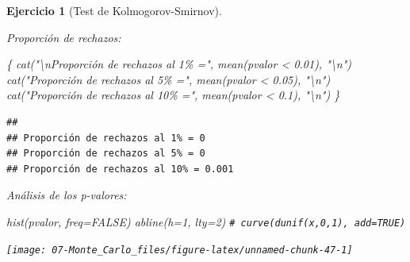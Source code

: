\documentclass[
]{book}
\newenvironment{Shaded}{\begin{snugshade}}{\end{snugshade}}
\newcommand{\AttributeTok}[1]{\textcolor[rgb]{0.77,0.63,0.00}{#1}}
\newcommand{\CommentTok}[1]{\textcolor[rgb]{0.56,0.35,0.01}{\textit{#1}}}
\newcommand{\ConstantTok}[1]{\textcolor[rgb]{0.00,0.00,0.00}{#1}}
\newcommand{\DecValTok}[1]{\textcolor[rgb]{0.00,0.00,0.81}{#1}}
\newcommand{\FloatTok}[1]{\textcolor[rgb]{0.00,0.00,0.81}{#1}}
\newcommand{\FunctionTok}[1]{\textcolor[rgb]{0.00,0.00,0.00}{#1}}
\newcommand{\NormalTok}[1]{#1}
\newcommand{\SpecialCharTok}[1]{\textcolor[rgb]{0.00,0.00,0.00}{#1}}
\newcommand{\StringTok}[1]{\textcolor[rgb]{0.31,0.60,0.02}{#1}}
\theoremstyle{break}
\newtheorem{exercise}{Ejercicio}[chapter]
\theoremstyle{nonumberplain}
\renewcommand{\CommentTok}[1]{\textcolor[rgb]{0.41,0.41,0.41}{\texttt{#1}}}
\begin{document}
\begin{exercise}[Test de Kolmogorov-Smirnov]
\begin{enumerate}
  Proporción de rechazos:

\begin{Shaded}
\begin{Highlighting}[]
\NormalTok{\{}
  \FunctionTok{cat}\NormalTok{(}\StringTok{"}\SpecialCharTok{\textbackslash{}n}\StringTok{Proporción de rechazos al 1\% ="}\NormalTok{, }\FunctionTok{mean}\NormalTok{(pvalor }\SpecialCharTok{\textless{}} \FloatTok{0.01}\NormalTok{), }\StringTok{"}\SpecialCharTok{\textbackslash{}n}\StringTok{"}\NormalTok{)}
  \FunctionTok{cat}\NormalTok{(}\StringTok{"Proporción de rechazos al 5\% ="}\NormalTok{, }\FunctionTok{mean}\NormalTok{(pvalor }\SpecialCharTok{\textless{}} \FloatTok{0.05}\NormalTok{), }\StringTok{"}\SpecialCharTok{\textbackslash{}n}\StringTok{"}\NormalTok{)}
  \FunctionTok{cat}\NormalTok{(}\StringTok{"Proporción de rechazos al 10\% ="}\NormalTok{, }\FunctionTok{mean}\NormalTok{(pvalor }\SpecialCharTok{\textless{}} \FloatTok{0.1}\NormalTok{), }\StringTok{"}\SpecialCharTok{\textbackslash{}n}\StringTok{"}\NormalTok{)}
\NormalTok{\}}
\end{Highlighting}
\end{Shaded}

\begin{verbatim}
## 
## Proporción de rechazos al 1% = 0 
## Proporción de rechazos al 5% = 0 
## Proporción de rechazos al 10% = 0.001
\end{verbatim}

  Análisis de los p-valores:

\begin{Shaded}
\begin{Highlighting}[]
\FunctionTok{hist}\NormalTok{(pvalor, }\AttributeTok{freq=}\ConstantTok{FALSE}\NormalTok{)}
\FunctionTok{abline}\NormalTok{(}\AttributeTok{h=}\DecValTok{1}\NormalTok{, }\AttributeTok{lty=}\DecValTok{2}\NormalTok{)   }\CommentTok{\# curve(dunif(x,0,1), add=TRUE)}
\end{Highlighting}
\end{Shaded}

  \begin{center}\texttt{[image: 07-Monte\_Carlo\_files/figure-latex/unnamed-chunk-47-1]} \end{center}


\end{enumerate}
\end{exercise}
\end{document}
